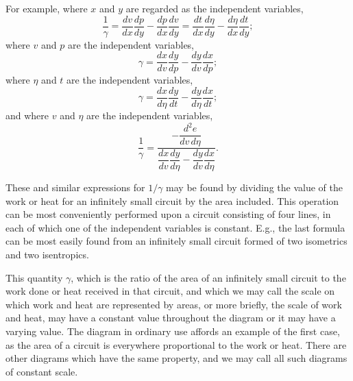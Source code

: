 \documentclass[11pt]{article}
\begin{document}
For example, where $x$ and $y$ are regarded as the independent variables,
\begin{equation*}
\frac1\gamma=\frac{dv}{dx}\frac{dp}{dy}-\frac{dp}{dx}\frac{dv}{dy}
=\frac{dt}{dx}\frac{d\eta}{dy}-\frac{d\eta}{dx}\frac{dt}{dy};
\end{equation*}
where $v$ and $p$ are the independent variables,
\begin{equation*}
\gamma=\frac{dx}{dv}\frac{dy}{dp}-\frac{dy}{dv}\frac{dx}{dp};
\end{equation*}
where $\eta$ and $t$ are the independent variables,
\begin{equation*}
\gamma=\frac{dx}{d\eta}\frac{dy}{dt}-\frac{dy}{d\eta}\frac{dx}{dt};
\end{equation*}
and where $v$ and $\eta$ are the independent variables,
\begin{equation*}
\frac1\gamma=
\frac{-\dfrac{d^2e}{dv\,d\eta}}
{\dfrac{dx}{dv}\dfrac{dy}{d\eta}-\dfrac{dy}{dv}\dfrac{dx}{d\eta}}.
\end{equation*}

These and similar expressions for $1/\gamma$ may be found by dividing the value of the work or heat for an infinitely small circuit by the area included. This operation can be most conveniently performed upon a circuit consisting of four lines, in each of which one of the independent variables is constant. E.g., the last formula can be most easily found from an infinitely small circuit formed of two isometrics and two isentropics.

This quantity $\gamma$, which is the ratio of the area of an infinitely small circuit to the work done or heat received in that circuit, and which we may call the scale on which work and heat are represented by areas, or more briefly, the scale of work and heat, may have a constant value throughout the diagram or it may have a varying value. The diagram in ordinary use affords an example of the first case, as the area of a circuit is everywhere proportional to the work or heat. There are other diagrams which have the same property, and we may call all such diagrams of constant scale.
\end{document}
